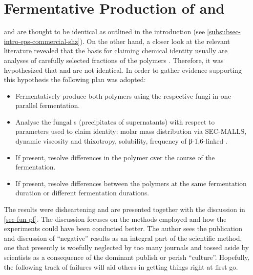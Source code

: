 \chapter[\SCL{} and \SHZ{} Production]{Fermentative Production of \SCL{} and \SHZ{}\label{chap-fun-pf}}
\SHZ{} and \scl{} are thought to be identical as outlined in the introduction (see \vref{subsubsec-intro-eps-commercial-shz}). On the other hand, %
a closer look at the relevant literature revealed that the basis for claiming chemical identity usually are analyses of carefully selected fractions of the polymers \cite{Norisuye1980, Yanaki1980, Kashiwagi1981, Yanaki1981, Sato1983, Yanaki1983a, Yanaki1983b, Yanaki1985}. Therefore, it was hypothesized that \shz{} and \scl{} are not identical. In order to gather evidence supporting this hypothesis the following plan was adopted:%
\begin{itemize}
	\item Fermentatively produce both polymers using the respective fungi in one parallel fermentation.
	\item Analyse the fungal \eps{}s (precipitates of supernatants) with respect to parameters used to claim identity: molar mass distribution via SEC-MALLS, dynamic viscosity and thixotropy, solubility, frequency of β-1,6-linked \glc{}.
	\item If present, resolve differences in the polymer over the course of the fermentation.
	\item If present, resolve differences between the polymers at the same fermentation duration or different fermentation durations.
\end{itemize}
The results were disheartening and are presented together with the discussion in \vref{sec-fun-pf}. The discussion focuses on the methods employed and how the experiments could have been conducted better. The author sees the publication and discussion of \enquote{negative} results as an integral part of the scientific method, one that presently is woefully neglected by too many journals and tossed aside by scientists as a consequence of the dominant publish or perish \enquote{culture}. Hopefully, the following track of failures will aid others in getting things right at first go.


